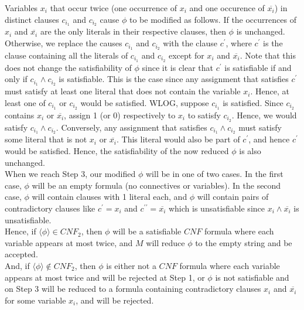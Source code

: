 \documentclass[12pt]{article}
\begin{document}
Variables $x_i$ that occur twice (one occurrence of $x_i$ and one occurence of $\overline{x_i}$) in distinct clauses $c_{i_1}$ and $c_{i_2}$ cause $\phi$ to be modified as follows. If the occurrences of $x_i$ and $\overline{x_i}$ are the only literals in their respective clauses, then $\phi$ is unchanged. Otherwise, we replace the causes $c_{i_1}$ and $c_{i_2}$ with the clause $c^\prime$, where $c^\prime$ is the clause containing all the literals of $c_{i_1}$ and $c_{i_2}$ except for $x_i$ and $\overline{x_i}$. Note that this does not change the satisfiability of $\phi$ since it is clear that $c^\prime$ is satisfiable if and only if  $c_{i_1} \land c_{i_2}$ is satisfiable. This is the case since any assignment that satisfies $c^\prime$ must satisfy at least one literal that does not contain the variable $x_i$. Hence, at least one of $c_{i_1}$ or $c_{i_2}$ would be satisfied. WLOG, suppose $c_{i_1}$ is satisfied. Since $c_{i_2}$ contains $x_i$ or $\overline{x_i}$, assign 1 (or 0) respectively to $x_i$ to satisfy $c_{i_2}$. Hence, we would satisfy $c_{i_1} \land c_{i_2}$. Conversely, any assignment that satisfies $c_{i_1} \land c_{i_2}$ must satisfy some literal that is not $x_i$ or $\overline{x_i}$. This literal would also be part of $c^\prime$, and hence $c^\prime$ would be satisfied. Hence, the satisfiability of the now reduced $\phi$ is also unchanged. \\


When we reach Step 3, our modified $\phi$ will be in one of two cases. In the first case, $\phi$ will be an empty formula (no connectives or variables). In the second case, $\phi$ will contain clauses with 1 literal each, and $\phi$ will contain pairs of contradictory clauses like $c^\prime = x_i$ and $c^{\prime \prime} = \overline{x_i}$ which is unsatisfiable since $x_i \land \overline{x_i}$ is unsatisfiable. \\

Hence, if $\langle \phi \rangle \in CNF_2$, then $\phi$ will be a satisfiable $CNF$ formula where each variable appears at most twice, and $M$ will reduce $\phi$ to the empty string and be accepted. \\

And, if $\langle \phi \rangle \not \in CNF_2$, then $\phi$ is either not a $CNF$ formula where each variable appears at most twice and will be rejected at Step 1, or $\phi$ is not satisfiable and on Step 3 will be reduced to a formula containing contradictory clauses $x_i$ and $\overline{x_i}$ for some variable $x_i$, and will be rejected. \\
\end{document}
